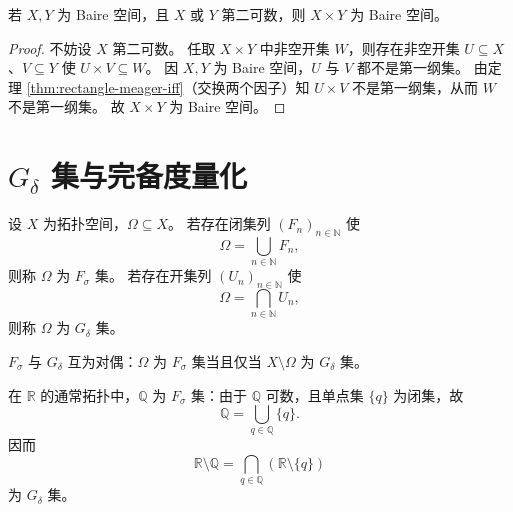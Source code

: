 \documentclass[lang=cn,a4paper,newtx,figureplace=section,tableplace=section]{elegantbook}
\begin{document}
\begin{corollary}\label{cor:product-baire-second-countable-factor}
  若 $X,Y$ 为 Baire 空间，且 $X$ 或 $Y$ 第二可数，则 $X\times Y$ 为 Baire 空间。
\end{corollary}
 \begin{proof}
  不妨设 $X$ 第二可数。
  任取 $X\times Y$ 中非空开集 $W$，则存在非空开集 $U\subseteq X$、$V\subseteq Y$ 使 $U\times V\subseteq W$。
  因 $X,Y$ 为 Baire 空间，$U$ 与 $V$ 都不是第一纲集。
  由定理 \ref{thm:rectangle-meager-iff}（交换两个因子）知 $U\times V$ 不是第一纲集，从而 $W$ 不是第一纲集。
  故 $X\times Y$ 为 Baire 空间。
 \end{proof}

\section{$G_\delta$ 集与完备度量化}

\begin{definition}
  设 $X$ 为拓扑空间，$\Omega\subseteq X$。
  若存在闭集列 $(F_n)_{n\in\mathbb N}$ 使
  \[
    \Omega=\bigcup_{n\in\mathbb N}F_n,
  \]
  则称 $\Omega$ 为 $F_\sigma$ 集。
  若存在开集列 $(U_n)_{n\in\mathbb N}$ 使
  \[
    \Omega=\bigcap_{n\in\mathbb N}U_n,
  \]
  则称 $\Omega$ 为 $G_\delta$ 集。
\end{definition}

\begin{remark}
  $F_\sigma$ 与 $G_\delta$ 互为对偶：$\Omega$ 为 $F_\sigma$ 集当且仅当 $X\setminus\Omega$ 为 $G_\delta$ 集。
\end{remark}

\begin{example}
  在 $\mathbb R$ 的通常拓扑中，$\mathbb Q$ 为 $F_\sigma$ 集：由于 $\mathbb Q$ 可数，且单点集 $\{q\}$ 为闭集，故
  \[
    \mathbb Q=\bigcup_{q\in\mathbb Q}\{q\}.
  \]
  因而
  \[
    \mathbb R\setminus\mathbb Q=\bigcap_{q\in\mathbb Q}(\mathbb R\setminus\{q\})
  \]
  为 $G_\delta$ 集。
\end{example}
\end{document}
